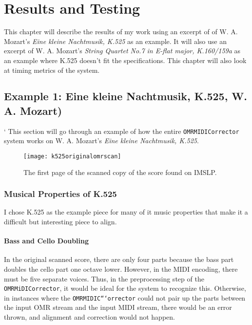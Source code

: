 \chapter{Results and Testing}
This chapter will describe the results of my work using an excerpt of of W. A. Mozart's \textit{Eine kleine Nachtmusik, K.525} as an example. It will also use an excerpt of W. A. Mozart's \textit{String Quartet No.7 in E-flat major, K.160/159a} as an example where K.525 doesn't fit the specifications. This chapter will also look at timing metrics of the system.

\section{Example 1: Eine kleine Nachtmusik, K.525, W. A. Mozart)}		`
This section will go through an example of how the entire \texttt{OMRMIDICorrector} system works on W. A. Mozart's \textit{Eine kleine Nachtmusik, K.525}.

\begin{figure}[H]
\centering
\texttt{[image: k525originalomrscan]}
\caption{The first page of the scanned copy of the score found on IMSLP.}
\end{figure}

\subsection{Musical Properties of K.525}
I chose K.525 as the example piece for many of it music properties that make it a difficult but interesting piece to align. 

\subsubsection{Bass and Cello Doubling}
In the original scanned score, there are only four parts because the bass part doubles the cello part one octave lower. However, in the MIDI encoding, there must be five separate voices. Thus, in the preprocessing step of the \texttt{OMRMiDICorrector}, it would be ideal for the system to recognize this. Otherwise, in instances where the \texttt{OMRMIDIC```orrector} could not pair up the parts between the input OMR stream and the input MIDI stream, there would be an error thrown, and alignment and correction would not happen. 

